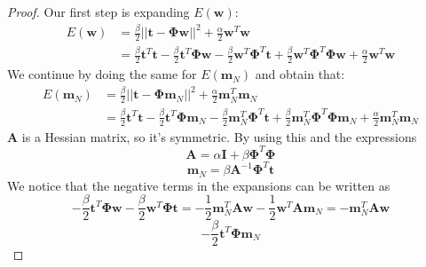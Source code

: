 \vspace{1em}

\begin{proof}
    Our first step is expanding $E(\mathbf{w})$:
    \begin{align*}
        E(\mathbf{w})
        &= \frac{\beta}{2} ||\mathbf{t} - \mathbf{\Phi}\mathbf{w}||^2 
            + \frac{\alpha}{2} \mathbf{w}^T\mathbf{w} \tag{3.79} \\
        &= \frac{\beta}{2} \mathbf{t}^T\mathbf{t} 
            - \frac{\beta}{2} \mathbf{t}^T\mathbf{\Phi}\mathbf{w} 
            - \frac{\beta}{2} \mathbf{w}^T\mathbf{\Phi}^T\mathbf{t}
            + \frac{\beta}{2} \mathbf{w}^T\mathbf{\Phi}^T\mathbf{\Phi}\mathbf{w}
            + \frac{\alpha}{2} \mathbf{w}^T\mathbf{w}
    \end{align*}
    We continue by doing the same for $E(\mathbf{m}_N)$ and obtain that:
    \begin{align*}
        E(\mathbf{m}_N)
        &= \frac{\beta}{2} ||\mathbf{t} - \mathbf{\Phi}\mathbf{m}_N||^2 
            + \frac{\alpha}{2} \mathbf{m}_N^T\mathbf{m}_N \\
        &= \frac{\beta}{2} \mathbf{t}^T\mathbf{t} 
            - \frac{\beta}{2} \mathbf{t}^T\mathbf{\Phi}\mathbf{m}_N 
            - \frac{\beta}{2} \mathbf{m}_N^T\mathbf{\Phi}^T\mathbf{t}
            + \frac{\beta}{2} \mathbf{m}_N^T\mathbf{\Phi}^T\mathbf{\Phi}\mathbf{m}_N
            + \frac{\alpha}{2} \mathbf{m}_N^T\mathbf{m}_N
    \end{align*}
    $\mathbf{A}$ is a Hessian matrix, so it's symmetric. By using this
    and the expressions
    \begin{equation*}
        \mathbf{A} = \alpha \mathbf{I} + \beta \mathbf{\Phi}^T\mathbf{\Phi}
        \tag{3.81}\label{eq:3.81}
    \end{equation*}
    \vspace{-1em}
    \begin{equation*}
        \mathbf{m}_N = \beta \mathbf{A}^{-1} \mathbf{\Phi}^T\mathbf{t}
        \tag{3.84}\label{eq:3.84}
    \end{equation*}
    We notice that the negative terms in the expansions can be written as
    \[
        -\frac{\beta}{2} \mathbf{t}^T\mathbf{\Phi}\mathbf{w}
            - \frac{\beta}{2} \mathbf{w}^T\mathbf{\Phi}\mathbf{t}
        =  
        -\frac{1}{2} \mathbf{m}_N^T\mathbf{A}\mathbf{w}
            -\frac{1}{2} \mathbf{w}^T\mathbf{A}\mathbf{m}_N
        = 
        -\mathbf{m}_N^T\mathbf{A}\mathbf{w}
    \] 
    \[
        -\frac{\beta}{2} \mathbf{t}^T\mathbf{\Phi}\mathbf{m}_N
\]
\end{proof}
